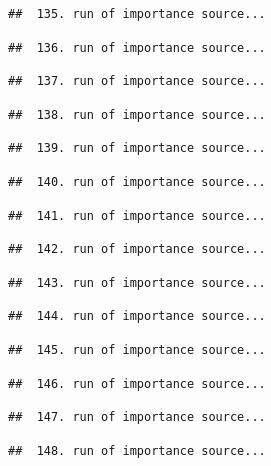 \documentclass[
]{article}
\begin{document}
\begin{verbatim}
##  135. run of importance source...
\end{verbatim}

\begin{verbatim}
##  136. run of importance source...
\end{verbatim}

\begin{verbatim}
##  137. run of importance source...
\end{verbatim}

\begin{verbatim}
##  138. run of importance source...
\end{verbatim}

\begin{verbatim}
##  139. run of importance source...
\end{verbatim}

\begin{verbatim}
##  140. run of importance source...
\end{verbatim}

\begin{verbatim}
##  141. run of importance source...
\end{verbatim}

\begin{verbatim}
##  142. run of importance source...
\end{verbatim}

\begin{verbatim}
##  143. run of importance source...
\end{verbatim}

\begin{verbatim}
##  144. run of importance source...
\end{verbatim}

\begin{verbatim}
##  145. run of importance source...
\end{verbatim}

\begin{verbatim}
##  146. run of importance source...
\end{verbatim}

\begin{verbatim}
##  147. run of importance source...
\end{verbatim}

\begin{verbatim}
##  148. run of importance source...
\end{verbatim}
\end{document}
